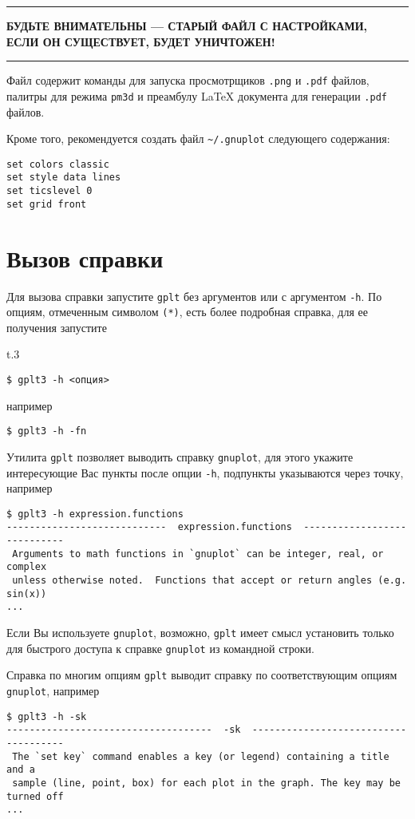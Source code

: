 \documentclass[12pt]{article}
\def\gplt{{\tt gplt}}
\def\gnuplot{{\tt gnuplot}}
\def\png{{\tt .png}}
\def\pdf{{\tt .pdf}}
\begin{document}
\hrule
\begin{center}
\bf БУДЬТЕ ВНИМАТЕЛЬНЫ --- СТАРЫЙ ФАЙЛ С НАСТРОЙКАМИ,\\
ЕСЛИ ОН СУЩЕСТВУЕТ, БУДЕТ УНИЧТОЖЕН!
  \end{center}
\hrule
\phantom{.}

Файл содержит команды для запуска просмотрщиков \png{} и \pdf{} файлов, палитры для режима \verb'pm3d' и преамбулу \LaTeX{} документа для генерации \pdf{} файлов.

Кроме того, рекомендуется создать файл \verb'~/.gnuplot' следующего содержания:
\begin{verbatim}
set colors classic
set style data lines
set ticslevel 0
set grid front
\end{verbatim}

\section{Вызов справки}
Для вызова справки запустите \gplt{} без аргументов или с аргументом \verb'-h'. По опциям, отмеченным символом \verb'(*)',
есть более подробная справка, для ее получения запустите
\begin{wrapfigure}[3]{t}{.3\textwidth}
\end{wrapfigure}
\begin{verbatim}
$ gplt3 -h <опция>
\end{verbatim}
например
\begin{verbatim}
$ gplt3 -h -fn
\end{verbatim}

Утилита \gplt{} позволяет выводить справку \gnuplot, для этого укажите интересующие Вас пункты после опции \verb'-h',
подпункты указываются через точку, например
\begin{verbatim}
$ gplt3 -h expression.functions
----------------------------  expression.functions  ----------------------------
 Arguments to math functions in `gnuplot` can be integer, real, or complex
 unless otherwise noted.  Functions that accept or return angles (e.g. sin(x))
...
\end{verbatim}
Если Вы используете \gnuplot, возможно, \gplt{} имеет смысл установить только для быстрого доступа к справке \gnuplot{} из командной строки.

Справка по многим опциям \gplt{} выводит справку по соответствующим опциям \gnuplot, например
\begin{verbatim}
$ gplt3 -h -sk
------------------------------------  -sk  -------------------------------------
 The `set key` command enables a key (or legend) containing a title and a
 sample (line, point, box) for each plot in the graph. The key may be turned off
...
\end{verbatim}
\end{document}
